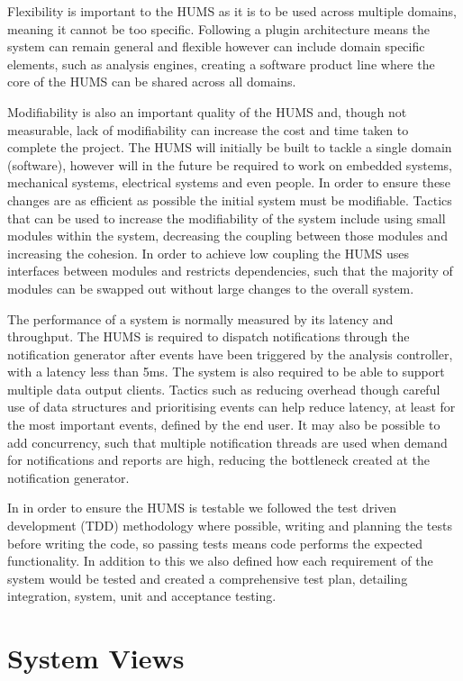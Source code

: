 \documentclass[10pt,a4paper]{article}
\begin{document}
Flexibility is important to the HUMS as it is to be used across multiple 
domains, meaning it cannot be too specific. Following a plugin 
architecture means the system can remain general and flexible however 
can include domain specific elements, such as analysis engines, 
creating a software product line where the core of the HUMS can be 
shared across all domains.

Modifiability is also an important quality of the HUMS and, though not 
measurable, lack of modifiability can increase the cost and time taken to 
complete the project. The HUMS will initially be built to tackle a single 
domain (software), however will in the future be required to work on embedded 
systems, mechanical systems, electrical systems and even people. In 
order to ensure these changes are as efficient as possible the initial system 
must be modifiable. Tactics that can be used to increase the modifiability 
of the system include using small modules within the system, decreasing the 
coupling between those modules and increasing the cohesion. In order 
to achieve low coupling  the HUMS uses interfaces between modules and 
restricts dependencies, such that the majority of modules can be 
swapped out without large changes to the overall system.

The performance of a system is normally measured by its latency and 
throughput. The HUMS is required to dispatch notifications through the 
notification generator after events have been triggered by the analysis 
controller, with a latency less than 5ms. The system is also required to be
able to support multiple data output clients. Tactics such as reducing
overhead though careful use of data structures and prioritising events can
help reduce latency, at least for the most important events, defined by the
end user. It may also be possible to add concurrency, such that multiple
notification threads are used when demand for notifications and reports are
high, reducing the bottleneck created at the notification generator.

In in order to ensure the HUMS is testable we followed the test driven 
development (TDD) methodology where possible, writing and planning the tests 
before writing the code, so passing tests means code performs the 
expected functionality. In addition to this we also defined how 
each requirement of the system would be tested and created a 
comprehensive test plan, detailing integration, system, unit and 
acceptance testing.

\section{System Views}
\label{sec:architecture-views}
\end{document}
